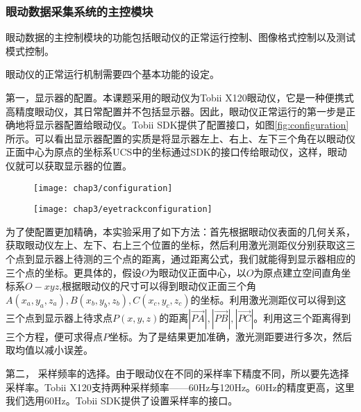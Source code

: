 \subsubsection{眼动数据采集系统的主控模块}
\label{sec:controller}
眼动数据的主控制模块的功能包括眼动仪的正常运行控制、图像格式控制以及测试模式控制。

眼动仪的正常运行机制需要四个基本功能的设定。

第一，显示器的配置。本课题采用的眼动仪为Tobii X120眼动仪，它是一种便携式高精度眼动仪，其日常配置并不包括显示器。因此，眼动仪正常运行的第一步是正确地将显示器配置给眼动仪。Tobii SDK提供了配置接口，如图\ref{fig:configuration}所示\parencite{manualuser}。可以看出显示器配置的实质是将显示器左上、右上、左下三个角在以眼动仪正面中心为原点的坐标系UCS中的坐标通过SDK的接口传给眼动仪，这样，眼动仪就可以获取显示器的位置。
\begin{figure}[!htp]
  \centering
  \texttt{[image: chap3/configuration]}
\end{figure}
\begin{figure}[!htp]
  \centering
  \texttt{[image: chap3/eyetrackconfiguration]}
\end{figure}
为了使配置更加精确，本实验采用了如下方法：首先根据眼动仪表面的几何关系，获取眼动仪左上、左下、右上三个位置的坐标，然后利用激光测距仪分别获取这三个点到显示器上待测的三个点的距离，通过距离公式，我们就能得到显示器相应的三个点的坐标。更具体的，假设$O$为眼动仪正面中心，以$O$为原点建立空间直角坐标系$O-xyz$,根据眼动仪的尺寸可以得到眼动仪正面三个角$A(x_a,y_a,z_a),B(x_b,y_b,z_b),C(x_c,y_c,z_c)$的坐标。利用激光测距仪可以得到这三个点到显示器上待求点$P(x,y,z)$的距离$\left| {\overrightarrow {PA} } \right|,\left| {\overrightarrow {PB} } \right|,\left| {\overrightarrow {PC} } \right|$。利用这三个距离得到三个方程，便可求得点$P$坐标。为了是结果更加准确，激光测距要进行多次，然后取均值以减小误差。

第二， 采样频率的选择。由于眼动仪在不同的采样率下精度不同，所以要先选择采样率。Tobii X120支持两种采样频率——60Hz与120Hz。60Hz的精度更高，这里我们选用60Hz。Tobii SDK提供了设置采样率的接口。

